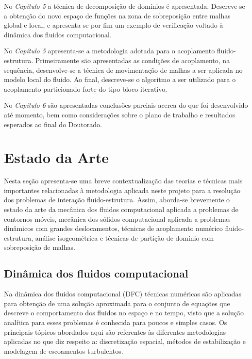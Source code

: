 \documentclass[tese_patricia.tex]{subfiles}
\begin{document}
No \textit{Capítulo 5} a técnica de decomposição de domínios é apresentada. Descreve-se a obtenção do novo espaço de funções na zona de sobreposição entre malhas global e local, e apresenta-se por fim um exemplo de verificação voltado à dinâmica dos fluidos computacional.

No \textit{Capítulo 5} apresenta-se a metodologia adotada para o acoplamento fluido-estrutura. Primeiramente são apresentadas as condições de acoplamento, na sequência, desenvolve-se a técnica de movimentação de malhas a ser aplicada no modelo local do fluido. Ao final, descreve-se o algoritmo a ser utilizado para o acoplamento particionado forte do tipo bloco-iterativo.

No \textit{Capítulo 6} são apresentadas conclusões parciais acerca do que foi desenvolvido até momento, bem como considerações sobre o plano de trabalho e resultados esperados ao final do Doutorado.


\section[Estado da Arte]{Estado da Arte}\label{section:estado_da_arte}

Nesta seção apresenta-se uma breve contextualização das teorias e técnicas mais importantes relacionadas à metodologia aplicada neste projeto para a resolução dos problemas de interação fluido-estrutura. Assim, aborda-se brevemente o estado da arte da mecânica dos fluidos computacional aplicada a problemas de contornos móveis, mecânica dos sólidos computacional aplicada a problemas dinâmicos com grandes deslocamentos, técnicas de acoplamento numérico fluido-estrutura, análise isogeométrica e técnicas de partição de domínio com sobreposição de malhas.

\subsection{Dinâmica dos fluidos computacional}
\label{cfdsection}

Na dinâmica dos fluidos computacional (DFC) técnicas numéricas são aplicadas para obtenção de uma solução aproximada para o conjunto de equações que descreve o comportamento dos fluidos no espaço e no tempo, visto que a solução analítica para esses problemas é conhecida para poucos e simples casos. Os principais tópicos abordados aqui são referentes às diferentes metodologias aplicadas no que  diz respeito a: discretização espacial, métodos de estabilização e modelagem de escoamentos turbulentos. 
\end{document}
